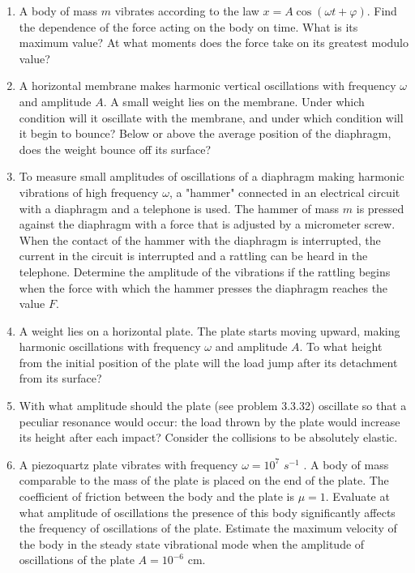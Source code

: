 \documentclass{article}
\begin{document}
\begin{enumerate}[label=3.3.\arabic*]
\item A body of mass $m$ vibrates according to the law $x = A \cos{(\omega t + \varphi)}$. Find the dependence of the force acting on the body on time. What is its maximum value? At what moments does the force take on its greatest modulo value?

\item A horizontal membrane makes harmonic vertical oscillations with frequency $\omega$ and amplitude $A$. A small weight lies on the membrane. Under which condition will it oscillate with the membrane, and under which condition will it begin to bounce? Below or above the average position of the diaphragm, does the weight bounce off its surface?

\item To measure small amplitudes of oscillations of a diaphragm making harmonic vibrations of high frequency $\omega$, a "hammer" connected in an electrical circuit with a diaphragm and a telephone is used. The hammer of mass $m$ is pressed against the diaphragm with a force that is adjusted by a micrometer screw. When the contact of the hammer with the diaphragm is interrupted, the current in the circuit is interrupted and a rattling can be heard in the telephone. Determine the amplitude of the vibrations if the rattling begins when the force with which the hammer presses the diaphragm reaches the value $F$.

\item A weight lies on a horizontal plate. The plate starts moving upward, making harmonic oscillations with frequency $\omega$ and amplitude $A$. To what height from the initial position of the plate will the load jump after its detachment from its surface?

\item With what amplitude should the plate (see problem 3.3.32) oscillate so that a peculiar resonance would occur: the load thrown by the plate would increase its height after each impact? Consider the collisions to be absolutely elastic.

\item A piezoquartz plate vibrates with frequency $\omega = 10^7$ $s^{-1}$ . A body of mass comparable to the mass of the plate is placed on the end of the plate. The coefficient of friction between the body and the plate is $\mu = 1$. Evaluate at what amplitude of oscillations the presence of this body significantly affects the frequency of oscillations of the plate. Estimate the maximum velocity of the body in the steady state vibrational mode when the amplitude of oscillations of the plate $A = 10^{-6}$ cm.


\end{enumerate}
\end{document}
